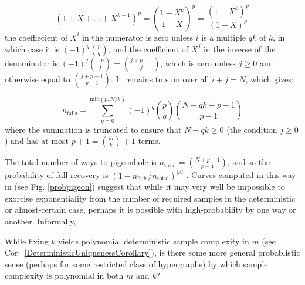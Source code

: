 \begin{equation*}
(1 + X + \ldots + X^{k-1})^p = \left(\frac{1 - X^k}{1 - X} \right)^p = \frac{\left(1 - X^k \right)^p}{\left(1 - X\right)^p}
\end{equation*}
the coeffiecient of $X^i$ in the numerator is zero unless $i$ is a multiple $qk$ of $k$, in which case it is $(-1)^q{p \choose q}$, and the coefficient of $X^j$ in the inverse of the denominator is $(-1)^j {-p \choose j} = {j + p-1 \choose j}$, which is zero unless $j \geq 0$ and otherwise equal to ${j + p-1 \choose p-1}$. It remains to sum over all $i + j = N$, which gives:

\begin{equation*}
n_\text{fails} = \sum_{q=0}^{\text{min}(p, N/k)} (-1)^q {p \choose q} {N - qk + p - 1 \choose p - 1}
\end{equation*}
where the summation is truncated to ensure that $N - qk \geq 0$ (the condition $j \geq 0$) and has at most $p+1 = {\overline m \choose k} + 1$ terms.

The total number of ways to pigeonhole is $n_\text{total} = {N +p- 1 \choose p - 1}$, and so the probability of full recovery is $\left(1 - n_\text{fails} / n_\text{total} \right)^{|\mathcal{H}|}$. 
Curves computed in this way in (see Fig. \ref{probpigeon}) suggest that while it may very well be impossible to exorcise exponentiality from the number of required samples in the deterministic or almost-certain case, perhaps it is possible with high-probability by one way or another. Informally,

\begin{question}
While fixing $k$ yields polynomial deterministic sample complexity in $m$ (see Cor.~\ref{DeterministicUniquenessCorollary}), is there some more general probablistic sense (perhaps for some restricted class of hypergraphs) by which sample complexity is polynomial in both $m$ and $k$?
\end{question}




